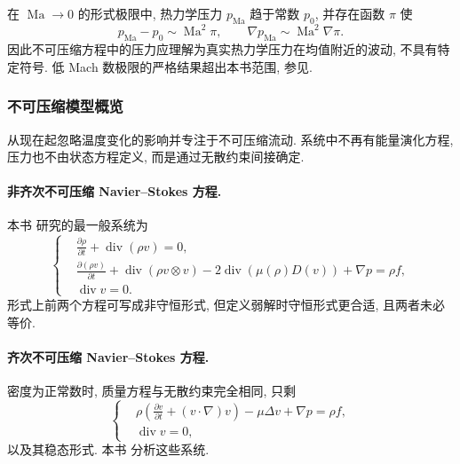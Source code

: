 在 $\operatorname{Ma}\to0$ 的形式极限中, 热力学压力 $p_{\operatorname{Ma}}$ 趋于常数 $p_0$, 并存在函数 $\pi$ 使
\[
  p_{\operatorname{Ma}}-p_0\sim\operatorname{Ma}^2\pi,
  \qquad \nabla p_{\operatorname{Ma}}\sim\operatorname{Ma}^2\nabla\pi.
\]
因此不可压缩方程中的压力应理解为真实热力学压力在均值附近的波动, 不具有特定符号. 低 Mach 数极限的严格结果超出本书范围, 参见.

\subsubsection{不可压缩模型概览}
\label{subsec:chap1-incompressible-overview}

从现在起忽略温度变化的影响并专注于不可压缩流动. 系统中不再有能量演化方程, 压力也不由状态方程定义, 而是通过无散约束间接确定.

\paragraph{非齐次不可压缩 Navier--Stokes 方程.}
\label{subsec:chap1-nonhomogeneous-navier-stokes}
本书 研究的最一般系统为
\[
\left\{
\begin{aligned}
&\frac{\partial\rho}{\partial t}+\operatorname{div}(\rho v)=0,\\
&\frac{\partial(\rho v)}{\partial t}+\operatorname{div}(\rho v\otimes v)-2\operatorname{div}(\mu(\rho)D(v))+\nabla p=\rho f,\\
&\operatorname{div}v=0.
\end{aligned}
\right.
\]
形式上前两个方程可写成非守恒形式, 但定义弱解时守恒形式更合适, 且两者未必等价.

\paragraph{齐次不可压缩 Navier--Stokes 方程.}
\label{subsec:chap1-homogeneous-navier-stokes}
密度为正常数时, 质量方程与无散约束完全相同, 只剩
\[
\left\{\begin{aligned}
&\rho\left(\frac{\partial v}{\partial t}+(v\cdot\nabla)v\right)-\mu\Delta v+\nabla p=\rho f,\\
&\operatorname{div}v=0,
\end{aligned}\right.
\]
以及其稳态形式. 本书 分析这些系统.

